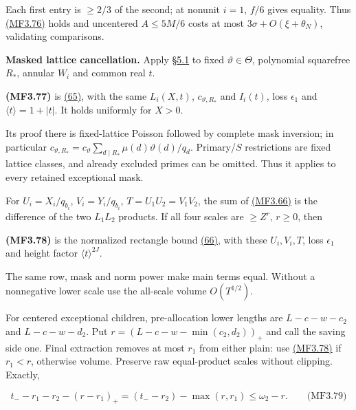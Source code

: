 Each first entry is \(\ge2/3\) of the second; at nonunit \(i=1\), \(f/6\) gives equality. Thus \protect\hyperlink{mf:eq:B3.76}{(MF3.76)} holds and uncentered \(A\le5M/6\) costs at most \(3\sigma+O(\xi+\theta_N)\), validating comparisons.

\textbf{Masked lattice cancellation.} Apply §\protect\hyperlink{cf:sec:D.1}{5.1} to fixed \(\vartheta\in\Theta\), polynomial squarefree \(R_*\), annular \(W_i\) and common real \(t\).

\hypertarget{mf:eq:B3.77}{}

\label{mf:eq:B3.77}

\textbf{(MF3.77)} is \protect\hyperlink{cf:eq:D.1}{(65)}, with the same \(L_i(X,t)\), \(c_{\vartheta,R_*}\) and \(I_i(t)\), loss \(\epsilon_1\) and \(\langle t\rangle=1+|t|\). It holds uniformly for \(X>0\).

Its proof there is fixed-lattice Poisson followed by complete mask inversion; in particular \(c_{\vartheta,R_*}=c_\vartheta\sum_{d\mid R_*}\mu(d)\vartheta(d)/q_d\). Primary/\(S\) restrictions are fixed lattice classes, and already excluded primes can be omitted. Thus it applies to every retained exceptional mask.

For \(U_i=X_i/q_{b_i}\), \(V_i=Y_i/q_{b_i}\), \(T=U_1U_2=V_1V_2\), the sum of \protect\hyperlink{mf:eq:B3.66}{(MF3.66)} is the difference of the two \(L_1L_2\) products. If all four scales are \(\ge Z^r\), \(r\ge0\), then

\hypertarget{mf:eq:B3.78}{}

\label{mf:eq:B3.78}

\textbf{(MF3.78)} is the normalized rectangle bound \protect\hyperlink{cf:eq:D.2}{(66)}, with these \(U_i,V_i,T\), loss \(\epsilon_1\) and height factor \(\langle t\rangle^{2J}\).

The same row, mask and norm power make main terms equal. Without a nonnegative lower scale use the all-scale volume \(O(T^{1/2})\).

For centered exceptional children, pre-allocation lower lengths are \(L-c-w-c_2\) and \(L-c-w-d_2\). Put \(r=(L-c-w-\min(c_2,d_2))_+\) and call the saving side one. Final extraction removes at most \(r_1\) from either plain: use \protect\hyperlink{mf:eq:B3.78}{(MF3.78)} if \(r_1<r\), otherwise volume. Preserve raw equal-product scales without clipping. Exactly,

\hypertarget{mf:eq:B3.79}{}

\label{mf:eq:B3.79}

\[
t_--r_1-r_2-(r-r_1)_+
=(t_--r_2)-\max(r,r_1)\le\omega_2-r.
\qquad\text{(MF3.79)}
\]

